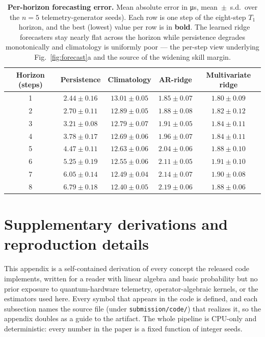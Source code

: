 \documentclass[
  aps,
  prresearch,
  reprint,
  amsmath,
  amssymb,
  nofootinbib,
  floatfix,
]{revtex4-2}
\newcommand{\T}{\ensuremath{T_1}}
\begin{document}
\begin{table}[t]
  \centering
  \small
  \caption{\textbf{Per-horizon forecasting error.} Mean absolute error in
  \si{\micro\second}, mean~$\pm$~s.d.\ over the $n=5$
  telemetry-generator seeds). Each row is one step of the eight-step \T\ horizon, and
  the best (lowest) value per row is in \textbf{bold}. The learned ridge forecasters
  stay nearly flat across the horizon while persistence degrades monotonically and
  climatology is uniformly poor --- the per-step view underlying
  Fig.~\ref{fig:forecast}a and the source of the widening skill margin.}
  \label{edtab:perhorizon}
\begin{tabular}{ccccc}
  \toprule
  Horizon (steps) & Persistence & Climatology & AR-ridge & Multivariate ridge \\
  \midrule
  1 & $2.44 \pm 0.16$ & $13.01 \pm 0.05$ & $1.85 \pm 0.07$ & $\mathbf{1.80 \pm 0.09}$ \\
  2 & $2.70 \pm 0.11$ & $12.89 \pm 0.05$ & $1.88 \pm 0.08$ & $\mathbf{1.82 \pm 0.12}$ \\
  3 & $3.21 \pm 0.08$ & $12.79 \pm 0.07$ & $1.91 \pm 0.05$ & $\mathbf{1.84 \pm 0.11}$ \\
  4 & $3.78 \pm 0.17$ & $12.69 \pm 0.06$ & $1.96 \pm 0.07$ & $\mathbf{1.84 \pm 0.11}$ \\
  5 & $4.47 \pm 0.11$ & $12.63 \pm 0.06$ & $2.04 \pm 0.06$ & $\mathbf{1.88 \pm 0.10}$ \\
  6 & $5.25 \pm 0.19$ & $12.55 \pm 0.06$ & $2.11 \pm 0.05$ & $\mathbf{1.91 \pm 0.10}$ \\
  7 & $6.05 \pm 0.14$ & $12.49 \pm 0.04$ & $2.14 \pm 0.07$ & $\mathbf{1.90 \pm 0.08}$ \\
  8 & $6.79 \pm 0.18$ & $12.40 \pm 0.05$ & $2.19 \pm 0.06$ & $\mathbf{1.88 \pm 0.06}$ \\
  \bottomrule
\end{tabular}
\end{table}


\section{Supplementary derivations and reproduction details}

\noindent This appendix is a self-contained derivation of every concept the released
code implements, written for a reader with linear algebra and basic probability but
no prior exposure to quantum-hardware telemetry, operator-algebraic kernels, or the
estimators used here. Every symbol that appears in the code is defined, and each
subsection names the source file (under \texttt{submission/code/}) that realizes it,
so the appendix doubles as a guide to the artifact. The whole pipeline is CPU-only
and deterministic: every number in the paper is a fixed function of integer seeds.
\end{document}
